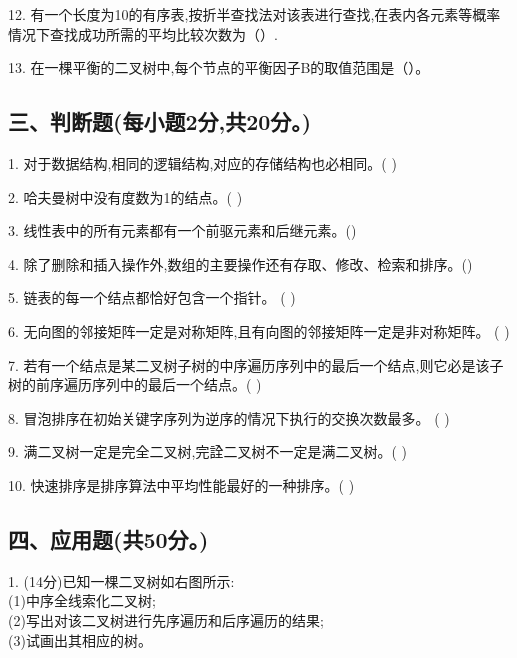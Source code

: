 12. 有一个长度为10的有序表,按折半查找法对该表进行查找,在表内各元素等概率情况下查找成功所需的平均比较次数为（）.

13. 在一棵平衡的二叉树中,每个节点的平衡因子B的取值范围是（）。

\subsection{三、判断题(每小题2分,共20分。)}

1. 对于数据结构,相同的逻辑结构,对应的存储结构也必相同。( )

2. 哈夫曼树中没有度数为1的结点。( )

3. 线性表中的所有元素都有一个前驱元素和后继元素。()

4. 除了删除和插入操作外,数组的主要操作还有存取、修改、检索和排序。()

5. 链表的每一个结点都恰好包含一个指针。 ( )

6. 无向图的邻接矩阵一定是对称矩阵,且有向图的邻接矩阵一定是非对称矩阵。 ( )

7. 若有一个结点是某二叉树子树的中序遍历序列中的最后一个结点,则它必是该子树的前序遍历序列中的最后一个结点。( )

8. 冒泡排序在初始关键字序列为逆序的情况下执行的交换次数最多。 ( )

9. 满二叉树一定是完全二叉树,完詮二叉树不一定是满二叉树。( )

10. 快速排序是排序算法中平均性能最好的一种排序。( )

\subsection{四、应用题(共50分。)}

1. (14分)已知一棵二叉树如右图所示: \\
(1)中序全线索化二叉树; \\
(2)写出对该二叉树进行先序遍历和后序遍历的结果; \\
(3)试画出其相应的树。

